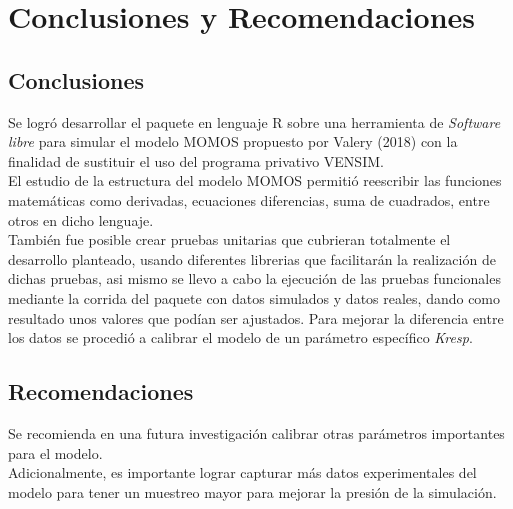 \chapter{Conclusiones y Recomendaciones}

\section{Conclusiones}

Se logr\'o desarrollar el paquete en lenguaje R sobre una herramienta de \textit{Software libre} para simular el modelo MOMOS propuesto por Valery (2018) con la finalidad de sustituir el uso del programa privativo VENSIM.\\

El estudio de la estructura del modelo MOMOS permiti\'o reescribir las funciones matem\'aticas como derivadas, ecuaciones diferencias, suma de cuadrados, entre otros en dicho lenguaje.\\

También fue posible crear pruebas unitarias que cubrieran totalmente el desarrollo planteado, usando diferentes librerias que facilitar\'an la realizaci\'on de dichas pruebas, asi mismo se llevo a cabo la ejecuci\'on de las pruebas funcionales mediante la corrida del paquete con datos simulados y datos reales, dando como resultado unos valores que pod\'ian ser ajustados. Para mejorar la diferencia entre los datos se procedi\'o a calibrar el modelo de un par\'ametro espec\'ifico \textit{Kresp}.\\

\section{Recomendaciones}

Se recomienda en una futura investigaci\'on calibrar otras par\'ametros importantes para el modelo.\\

Adicionalmente, es importante lograr capturar m\'as datos experimentales del modelo para tener un muestreo mayor para mejorar la presi\'on de la simulaci\'on.